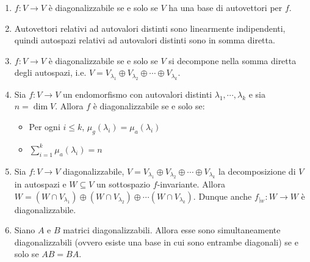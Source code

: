 \documentclass[a4paper,11pt]{article}
\begin{document}
\begin{enumerate}[resume]
	\item $f\colon V\to V$ è diagonalizzabile se e solo se $V$ ha una base di autovettori per $f$.
	\item Autovettori relativi ad autovalori distinti sono linearmente indipendenti, quindi autospazi relativi ad autovalori distinti sono in somma diretta.
	\item $f\colon V\to V$ è diagonalizzabile se e solo se $V$ si decompone nella somma diretta degli autospazi, i.e. $V=V_{\lambda_1}\oplus V_{\lambda_2}\oplus\cdots\oplus V_{\lambda_k}$.
	\item Sia $f\colon V\to V$ un endomorfismo con autovalori distinti $\lambda_1,\cdots,\lambda_k$ e sia $n=\dim V$. Allora $f$ è diagonalizzabile se e solo se:
	\begin{itemize}
		\item Per ogni $i\leq k$, $\mu_g(\lambda_i)=\mu_a(\lambda_i)$
		\item $\sum_{i=1}^{k}\mu_a(\lambda_i)=n$
	\end{itemize}
	\item Sia $f\colon V\to V$ diagonalizzabile, $V=V_{\lambda_1}\oplus V_{\lambda_2}\oplus\cdots\oplus V_{\lambda_k}$ la decomposizione di $V$ in autospazi e $W\subseteq V$ un sottospazio $f$-invariante. Allora $W=\left(W\cap V_{\lambda_1}\right)\oplus\left(W\cap V_{\lambda_2}\right)\oplus\cdots\left(W\cap V_{\lambda_k}\right)$. Dunque anche $f_{\left|_W\right.}\colon W\to W$ è diagonalizzabile.
	\item Siano $A$ e $B$ matrici diagonalizzabili. Allora esse sono simultaneamente diagonalizzabili (ovvero esiste una base in cui sono entrambe diagonali) se e solo se $AB=BA$.
\end{enumerate}
\end{document}

